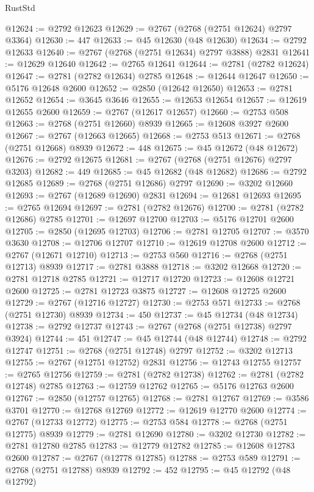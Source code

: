 \begin{lexlean}{RustStd}
\begin{coremodule}
@12624 := @2792 @12623
@12629 := @2767 (@2768 (@2751 @12624) @2797 @3364)
@12630 := 447
@12633 := @45 @12630 (@48 @12630)
@12634 := @2792 @12633
@12640 := @2767 (@2768 (@2751 @12634) @2797 @3888) @2831
@12641 := @12629 @12640
@12642 := @2765 @12641
@12644 := @2781 (@2782 @12624)
@12647 := @2781 (@2782 @12634) @2785
@12648 := @12644 @12647
@12650 := @5176 @12648 @2600
@12652 := @2850 (@12642 @12650)
@12653 := @2781 @12652
@12654 := @3645 @3646
@12655 := @12653 @12654
@12657 := @12619 @12655 @2600
@12659 := @2767 (@12617 @12657)
@12660 := @2753 @508
@12663 := @2768 (@2751 @12660) @8939
@12665 := @12608 @3927 @2600
@12667 := @2767 (@12663 @12665)
@12668 := @2753 @513
@12671 := @2768 (@2751 @12668) @8939
@12672 := 448
@12675 := @45 @12672 (@48 @12672)
@12676 := @2792 @12675
@12681 := @2767 (@2768 (@2751 @12676) @2797 @3203)
@12682 := 449
@12685 := @45 @12682 (@48 @12682)
@12686 := @2792 @12685
@12689 := @2768 (@2751 @12686) @2797
@12690 := @3202 @12660
@12693 := @2767 (@12689 @12690) @2831
@12694 := @12681 @12693
@12695 := @2765 @12694
@12697 := @2781 (@2782 @12676)
@12700 := @2781 (@2782 @12686) @2785
@12701 := @12697 @12700
@12703 := @5176 @12701 @2600
@12705 := @2850 (@12695 @12703)
@12706 := @2781 @12705
@12707 := @3570 @3630
@12708 := @12706 @12707
@12710 := @12619 @12708 @2600
@12712 := @2767 (@12671 @12710)
@12713 := @2753 @560
@12716 := @2768 (@2751 @12713) @8939
@12717 := @2781 @3888
@12718 := @3202 @12668
@12720 := @2781 @12718 @2785
@12721 := @12717 @12720
@12723 := @12608 @12721 @2600
@12725 := @2781 @12723 @3875
@12727 := @12608 @12725 @2600
@12729 := @2767 (@12716 @12727)
@12730 := @2753 @571
@12733 := @2768 (@2751 @12730) @8939
@12734 := 450
@12737 := @45 @12734 (@48 @12734)
@12738 := @2792 @12737
@12743 := @2767 (@2768 (@2751 @12738) @2797 @3924)
@12744 := 451
@12747 := @45 @12744 (@48 @12744)
@12748 := @2792 @12747
@12751 := @2768 (@2751 @12748) @2797
@12752 := @3202 @12713
@12755 := @2767 (@12751 @12752) @2831
@12756 := @12743 @12755
@12757 := @2765 @12756
@12759 := @2781 (@2782 @12738)
@12762 := @2781 (@2782 @12748) @2785
@12763 := @12759 @12762
@12765 := @5176 @12763 @2600
@12767 := @2850 (@12757 @12765)
@12768 := @2781 @12767
@12769 := @3586 @3701
@12770 := @12768 @12769
@12772 := @12619 @12770 @2600
@12774 := @2767 (@12733 @12772)
@12775 := @2753 @584
@12778 := @2768 (@2751 @12775) @8939
@12779 := @2781 @12690
@12780 := @3202 @12730
@12782 := @2781 @12780 @2785
@12783 := @12779 @12782
@12785 := @12608 @12783 @2600
@12787 := @2767 (@12778 @12785)
@12788 := @2753 @589
@12791 := @2768 (@2751 @12788) @8939
@12792 := 452
@12795 := @45 @12792 (@48 @12792)

\end{coremodule}
\end{lexlean}
